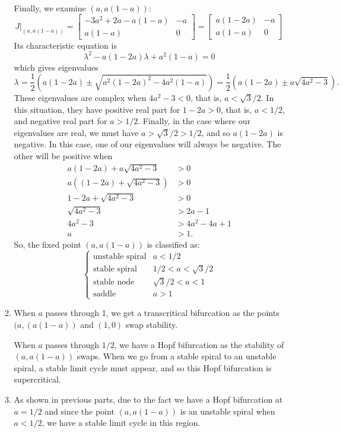 \documentclass[10pt,letterpaper]{report}
\newcommand{\mtx}[2]{\left[\begin{array}{#1}#2\end{array}\right]}
\begin{document}
\begin{enumerate}
\begin{enumerate}
    Finally, we examine $(a, a(1 - a))$:
    \[
    J\big\vert_{(a, a(1 - a))} = \mtx{cr}{-3a^2 + 2a - a(1 - a) & -a \\ a(1 - a) & 0} = \mtx{cr}{a(1 - 2a) & -a \\ a(1 - a) & 0}
    \]
    Its characteristic equation is
    \[
    \lambda^2 - a(1 - 2a)\lambda + a^2(1 - a) = 0
    \]
    which gives eigenvalues
    \[
    \lambda = \frac{1}{2}\left(a(1 - 2a) \pm \sqrt{a^2(1 - 2a)^2 - 4a^2(1 - a)}\right) = \frac{1}{2}\left(a(1 - 2a) \pm a\sqrt{4a^2 - 3}\right).
    \]
    These eigenvalues are complex when $4a^2 - 3 < 0$, that is, $a < \sqrt{3}/2$. In this situation, they have positive real part for $1 - 2a > 0$, that is, $a < 1/2$, and negative real part for $a > 1/2$. Finally, in the case where our eigenvalues are real, we must have $a > \sqrt{3}/2 > 1/2$, and so $a(1 - 2a)$ is negative. In this case, one of our eigenvalues will always be negative. The other will be positive when
    \begin{align*}
        a(1 - 2a) + a\sqrt{4a^2 - 3} &> 0
        \\
        a\left((1 - 2a) + \sqrt{4a^2 - 3}\right) &> 0
        \\
        1 - 2a + \sqrt{4a^2 - 3} &> 0
        \\
        \sqrt{4a^2 - 3} &> 2a - 1
        \\
        4a^2 - 3 &> 4a^2 - 4a + 1
        \\
        a &> 1.
    \end{align*}
    So, the fixed point $(a, a(1-a))$ is classified as:
    \[
    \begin{cases}
    \textrm{unstable spiral} &a < 1/2 \\
    \textrm{stable spiral} &1/2 < a < \sqrt{3}/2 \\
    \textrm{stable node} &\sqrt{3}/2 < a < 1 \\
    \textrm{saddle} &a > 1
    \end{cases}
    \]
    
    \item When $a$ passes through 1, we get a transcritical bifurcation as the points $(a, (a(1-a))$ and $(1, 0)$ swap stability. 
    
    When $a$ passes through $1/2$, we have a Hopf bifurcation as the stability of $(a, a(1 - a))$ swaps. When we go from a stable spiral to an unstable spiral, a stable limit cycle must appear, and so this Hopf bifurcation is supercritical.
    
    \item As shown in previous parts, due to the fact we have a Hopf bifurcation at $a = 1/2$ and since the point $(a, a(1-a))$ is an unstable spiral when $a < 1/2$, we have a stable limit cycle in this region.
    

\end{enumerate}
\end{enumerate}
\end{document}
